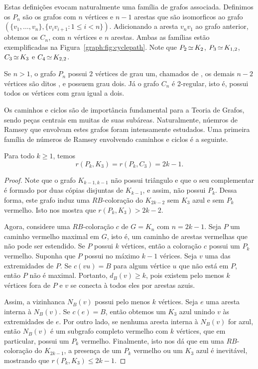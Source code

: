 Estas definições evocam naturalmente uma família de grafos associada. Definimos os  $P_n$ são os grafos com $n$ vértices e $n-1$ arestas que são isomorficos ao grafo $(\{v_1,\dots,v_n\}, \{v_iv_{i+1}: 1\leq i < n\})$. Adicionando a aresta $v_nv_1$ ao grafo anterior, obtemos os  $C_n$, com $n$ vértices e $n$ arestas. Ambas as famílias estão exemplificadas na Figura~\ref{graph:fig:cyclepath}.
Note que $P_2 \operatorname{\simeq} K_2$, $P_3 \operatorname{\simeq} K_{1,2}$, $C_3 \operatorname{\simeq} K_3$ e $C_4 \operatorname{\simeq} K_{2,2}$.

Se $n > 1$, o grafo $P_n$ possui $2$ vértices de grau um, chamados de , os demais $n-2$ vértices são ditos , e possuem grau dois. Já o grafo $C_n$ é 2-regular, isto é, possui todos os vértices com grau igual a dois.

Os caminhos e ciclos são de importância fundamental para a Teoria de Grafos, sendo peças centrais em muitas de suas subáreas. Naturalmente, núemros de Ramsey que envolvam estes grafos foram intensamente estudados. Uma primeira família de números de Ramsey envolvendo caminhos e ciclos é a seguinte.

\begin{proposition}
\label{graph:thm:rpt}  Para todo $k \geq 1$, temos
\[r(P_k, K_3) = r(P_k, C_3) = 2k - 1.\]
\end{proposition}
\begin{proof}
Note que o grafo $K_{k-1,k-1}$ não possui triângulo e que o seu complementar é formado por duas cópias disjuntas de $K_{k-1}$, e assim, não possui $P_k$. Dessa forma, este grafo induz uma $RB$-coloração do $K_{2k - 2}$ sem $K_3$ azul e sem $P_k$ vermelho. Isto nos mostra que $r(P_k, K_3) > 2k - 2$.

Agora, considere uma $RB$-coloração $c$ de $G=K_n$ com $n = 2k-1$. Seja $P$ um caminho vermelho maximal em $G$, isto é, um caminho de arestas vermelhas que não pode ser estendido. Se $P$ possui $k$ vértices, então a coloração $c$ possui um $P_k$ vermelho. Suponha que $P$ possui no máximo $k-1$ vérices. Seja $v$ uma das extremidades de $P$. Se $c(vu) = B$ para algum vértice $u$ que não está em $P$, então $P$ não é maximal. Portanto, $d_B(v) \geq k$, pois existem pelo menos $k$ vértices fora de $P$ e $v$ se conecta à todos eles por arestas azuis.

Assim, a vizinhanca $N_B(v)$ possui pelo menos $k$ vértices. Seja $e$ uma aresta interna à $N_B(v)$. Se $c(e) = B$, então obtemos um $K_3$ azul unindo $v$ às extremidades de $e$. Por outro lado, se nenhuma aresta interna à $N_B(v)$ for azul, então $N_B(v)$ é um subgrafo completo vermelho com $k$ vértices, que em particular, possui um $P_k$ vermelho. Finalmente, isto nos dá que em uma $RB$-coloração do $K_{2k-1}$, a presença de um $P_k$ vermelho ou um $K_3$ azul é inevitável, mostrando que $r(P_k, K_3) \leq 2k-1$.
\end{proof}

